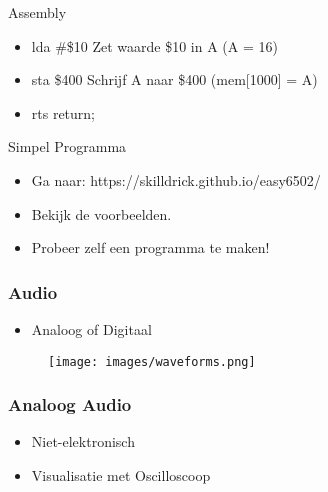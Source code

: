 \documentclass[aspectratio=43]{uva-inf-presentation}
\begin{document}

\begin{frame}{Assembly}

\begin{itemize}
\item lda \#\$10 Zet waarde \$10 in A (A = 16)
\item sta \$400 Schrijf A naar \$400 (mem[1000] = A)
\item rts return;
\end{itemize}

\end{frame}


\begin{frame}{Simpel Programma}

\begin{itemize}
\item Ga naar: https://skilldrick.github.io/easy6502/
\item Bekijk de voorbeelden.
\item Probeer zelf een programma te maken!
\end{itemize}


\end{frame}


\begin{frame}
\frametitle{Audio}

\begin{itemize}
\item Analoog of Digitaal
\end{itemize}

\begin{figure}
\texttt{[image: images/waveforms.png]}
\end{figure}

\end{frame}


\begin{frame}
\frametitle{Analoog Audio}

\begin{itemize}
\item Niet-elektronisch
\item Visualisatie met Oscilloscoop
\end{itemize}

\end{frame}
\end{document}
